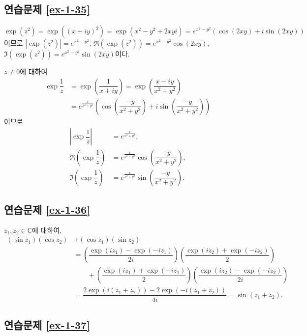 \subsection*{연습문제 \ref{ex-1-35}}

\[
\exp(z^2) = \exp\left( (x+iy)^2 \right)
= \exp(x^2-y^2 + 2xyi) = e^{x^2-y^2}( \cos(2xy) + i \sin (2xy))
\]
이므로
$|\exp(z^2)| = e^{x^2-y^2}$, $\Re(\exp(z^2)) = e^{x^2-y^2} \cos(2xy)$,
$\Im(\exp(z^2)) = e^{x^2-y^2} \sin(2xy)$이다.

$z\ne0$에 대하여
\begin{align*}
\exp \dfrac1z &= \exp\left(\dfrac1{x+iy}\right)
= \exp\left( \dfrac{x-iy}{x^2+y^2} \right) \\
&= e^{\frac{x}{x^2+y^2}} \left( \cos \left( \dfrac{-y}{x^2+y^2} \right)
+i  \sin \left( \dfrac{-y}{x^2+y^2} \right) \right)
\end{align*}
이므로
\begin{align*}
\left| \exp \dfrac1z \right| &= e^{\frac{x}{x^2+y^2}}, \\
\Re\left( \exp \dfrac1z \right) 
& = e^{\frac{x}{x^2+y^2}} \cos \left( \dfrac{-y}{x^2+y^2} \right), \\
\Im\left( \exp \dfrac1z \right) 
&=  e^{\frac{x}{x^2+y^2}} \sin \left( \dfrac{-y}{x^2+y^2} \right).
\end{align*}

\subsection*{연습문제 \ref{ex-1-36}}

$z_1, z_2 \in \mathbb C$에 대하여,
\begin{align*}
(\sin z_1)(\cos z_2) &+ (\cos z_1)(\sin z_2) \\
&= \left( \dfrac{\exp(iz_1) - \exp(-iz_1)}{2i}\right)
\left( \dfrac{\exp(iz_2) + \exp(-iz_2)}{2}\right) \\
&\qquad + \left( \dfrac{\exp(iz_1) + \exp(-iz_1)}{2}\right) 
\left( \dfrac{\exp(iz_2) - \exp(-iz_2)}{2i}\right) \\
&= \dfrac{2\exp(i(z_1+z_2)) -2\exp(-i(z_1+z_2))}{4i}
= \sin(z_1+z_2).
\end{align*}

\subsection*{연습문제 \ref{ex-1-37}}

